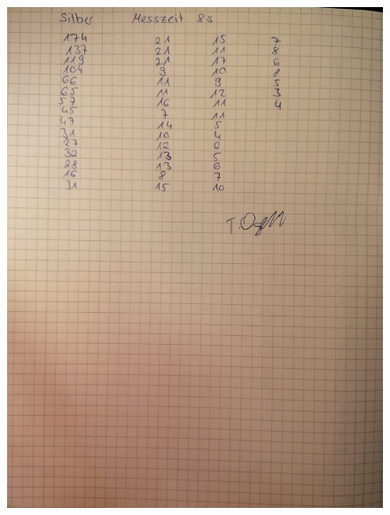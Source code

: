 \begin{figure}
    \centering
    \includegraphics[width=\textwidth]{content/Anhang 2.jpg}
\end{figure}